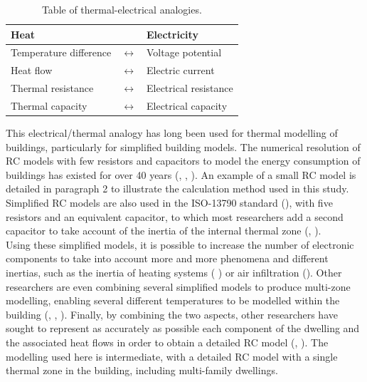 \documentclass[11pt]{article}
\begin{document}
        \begin{table}[ht]
          \centering
          \small
          \caption{\label{tab:analogyrc} Table of thermal-electrical analogies.}
          \begin{tabular}{lcl}
            \toprule
            Heat & & Electricity\\
            \midrule
            Temperature difference & $\leftrightarrow$ & Voltage potential\\
            Heat flow & $\leftrightarrow$ & Electric current\\
            Thermal resistance & $\leftrightarrow$ & Electrical resistance\\
            Thermal capacity & $\leftrightarrow$ & Electrical capacity\\
            \bottomrule
          \end{tabular}
        \end{table}

        This electrical/thermal analogy has long been used for thermal modelling of buildings, particularly for simplified building models. The numerical resolution of RC models with few resistors and capacitors to model the energy consumption of buildings has existed for over 40 years (\cite{francis_methode_1982}, \cite{madsen_estimation_1995}, \cite{fraisse_development_2002}). An example of a small RC model is detailed in paragraph 2 to illustrate the calculation method used in this study. Simplified RC models are also used in the ISO-13790 standard (\cite{iso_iso_2006}), with five resistors and an equivalent capacitor, to which most researchers add a second capacitor to take account of the inertia of the internal thermal zone (\cite{parc_etude_2014}, \cite{marty-jourjon_identifiability_2022}). \\

        Using these simplified models, it is possible to increase the number of electronic components to take into account more and more phenomena and different inertias, such as the inertia of heating systems ( \cite{bacher_identifying_2011}) or air infiltration (\cite{reynders_quality_2014}). Other researchers are even combining several simplified models to produce multi-zone modelling, enabling several different temperatures to be modelled within the building (\cite{belazi_thermal_2022}, \cite{vallianos_automatic_2022}, \cite{balali_energy_2023}). Finally, by combining the two aspects, other researchers have sought to represent as accurately as possible each component of the dwelling and the associated heat flows in order to obtain a detailed RC model (\cite{wang_development_2019}, \cite{cui_model_2022}). The modelling used here is intermediate, with a detailed RC model with a single thermal zone in the building, including multi-family dwellings. \\
\end{document}

